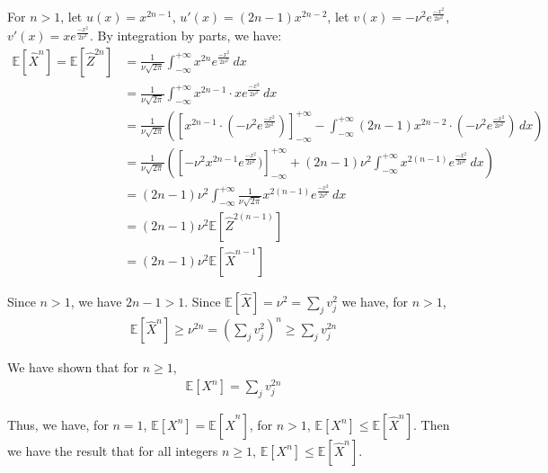 For $n>1$, 
let $u(x)=x^{2n-1}$, $u'(x)=(2n-1)x^{2n-2}$,
let $v(x)=-\nu ^2e^{\frac{-x^2}{2\nu ^2}}$, $v'(x)=xe^{\frac{-x^2}{2\nu^2}}$. 
By integration by parts, we have:
\begin{align}
    \nonumber \mathbb{E}[\widehat{X}^n]=\mathbb{E}[\widehat{Z}^{2n}]&=\frac{1}{\nu\sqrt{2\pi}}\int_{-\infty }^{+\infty }x^{2n}e^{\frac{-x^2}{2\nu ^2}}\,dx \\
    \nonumber &=\frac{1}{\nu\sqrt{2\pi}}\int_{-\infty }^{+\infty }x^{2n-1}\cdot xe^{\frac{-x^2}{2\nu ^2}}\,dx \\
    \nonumber &=\frac{1}{\nu\sqrt{2\pi}}\left(\left[x^{2n-1}\cdot(-\nu ^2e^{\frac{-x^2}{2\nu ^2}})\right]_{-\infty}^{+\infty}-\int_{-\infty }^{+\infty }(2n-1)x^{2n-2}\cdot (-\nu ^2e^{\frac{-x^2}{2\nu ^2}})\,dx \right)\\
    \nonumber &=\frac{1}{\nu\sqrt{2\pi}}\left(\left[-\nu ^2x^{2n-1}e^{\frac{-x^2}{2\nu ^2}})\right]_{-\infty}^{+\infty}+(2n-1)\nu ^2\int_{-\infty }^{+\infty }x^{2(n-1)}e^{\frac{-x^2}{2\nu ^2}}\,dx \right)\\
    \nonumber &=(2n-1)\nu ^2\int_{-\infty }^{+\infty }\frac{1}{\nu\sqrt{2\pi}}x^{2(n-1)}e^{\frac{-x^2}{2\nu ^2}}\,dx \\
    \nonumber &=(2n-1)\nu ^2 \mathbb{E}[\widehat{Z}^{2(n-1)}] \\
    \nonumber &=(2n-1)\nu ^2 \mathbb{E}[\widehat{X}^{n-1}]
\end{align}

Since $n>1$, we have $2n-1>1$.
Since $\mathbb{E}[\widehat{X}]=\nu ^2=\sum_jv_j^2$ we have, for $n>1$,
\begin{align}
    \nonumber \mathbb{E}[\widehat{X}^n]\ge\nu^{2n}=(\sum_jv_j^2)^n\ge\sum_j v_j^{2n}
\end{align}

We have shown that for $n\ge 1$,
\begin{align}
    \nonumber \mathbb{E}[X^n]=\sum_j v_j^{2n}
\end{align}

Thus, we have, for $n=1$, $\mathbb{E}[X^n]=\mathbb{E}[\widehat{X}^n]$,
for $n>1$,  $\mathbb{E}[X^n]\le\mathbb{E}[\widehat{X}^n]$.
Then we have the result that for all integers $n\ge 1$, $\mathbb{E}[X^n]\le\mathbb{E}[\widehat{X}^n]$.